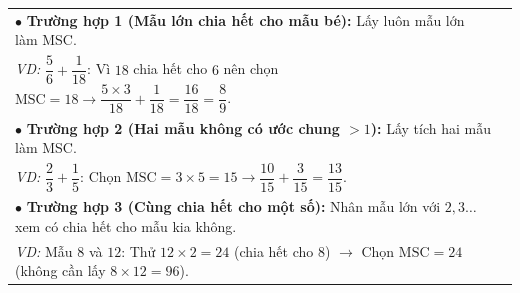 \documentclass[14pt,a4paper,oneside]{extbook}
\begin{document}
\vspace{3mm}

\noindent
\begin{tcolorbox}[
  enhanced,
  title={\footnotesize\bfseries\color{white}\faLightbulbO\ 3. Ba trường hợp tìm Mẫu số chung (MSC) thông minh},
  colback=purple!2!white,
  colframe=purple!70!black,
  arc=2.5mm, boxrule=0.8pt, top=1.8mm, bottom=1.8mm, left=2.5mm, right=2.5mm
]
  \footnotesize
  \begin{tabular}{ll}
    $\bullet$ \textbf{Trường hợp 1 (Mẫu lớn chia hết cho mẫu bé):} Lấy luôn mẫu lớn làm MSC.\\
    \quad \textit{VD:} $\dfrac{5}{6} + \dfrac{1}{18}$: Vì $18$ chia hết cho $6$ nên chọn $\text{MSC} = 18 \rightarrow \dfrac{5 \times 3}{18} + \dfrac{1}{18} = \dfrac{16}{18} = \dfrac{8}{9}$.\\
    $\bullet$ \textbf{Trường hợp 2 (Hai mẫu không có ước chung $>1$):} Lấy tích hai mẫu làm MSC.\\
    \quad \textit{VD:} $\dfrac{2}{3} + \dfrac{1}{5}$: Chọn $\text{MSC} = 3 \times 5 = 15 \rightarrow \dfrac{10}{15} + \dfrac{3}{15} = \dfrac{13}{15}$.\\
    $\bullet$ \textbf{Trường hợp 3 (Cùng chia hết cho một số):} Nhân mẫu lớn với $2, 3\dots$ xem có chia hết cho mẫu kia không.\\
    \quad \textit{VD:} Mẫu $8$ và $12$: Thử $12 \times 2 = 24$ (chia hết cho $8$) $\rightarrow$ Chọn $\text{MSC} = 24$ (không cần lấy $8 \times 12 = 96$).
  \end{tabular}
\end{tcolorbox}

\vspace{3mm}
\end{document}
